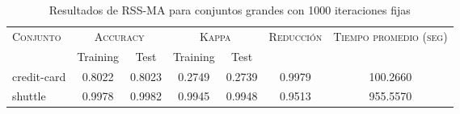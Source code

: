 \begin{table}[]
\centering
\begin{tabular}{l c c c c c c}
\hline
\multirow{2}{*}{\textsc{Conjunto}}
	& \multicolumn{2}{c}{\textsc{Accuracy}}
	& \multicolumn{2}{c}{\textsc{Kappa}}
	& \textsc{Reducción}
	& \textsc{Tiempo promedio (seg)} \\
	& Training & Test
	& Training & Test \\ 
\hline
\hline

credit-card & 0.8022 & 0.8023 & 0.2749 & 0.2739 & 0.9979 & 100.2660 \\
shuttle & 0.9978 & 0.9982 & 0.9945 & 0.9948 & 0.9513 & 955.5570 \\

\hline
\end{tabular}
\caption{Resultados de RSS-MA para conjuntos grandes con 1000 iteraciones fijas}
\label{res-grande-RSS-MA}
\end{table}

